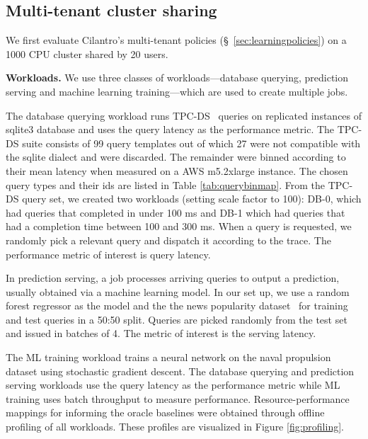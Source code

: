 
\subsection{Multi-tenant cluster sharing}
\label{sec:fixedclus}


We first evaluate Cilantro's multi-tenant policies (\S~\ref{sec:learningpolicies}) on a 1000 CPU
cluster shared by 20 users.


\textbf{Workloads.}
We use three classes of workloads---database querying, prediction serving and
machine learning training---which are used to create multiple jobs.

The database querying workload runs TPC-DS~\cite{tpc-ds} 
queries on replicated instances of sqlite3 database and uses the query latency as the performance metric. The TPC-DS suite consists of 99 query templates out of which 27 were not compatible with the sqlite dialect and were discarded. The remainder were binned according to their mean latency when measured on a AWS m5.2xlarge instance. The chosen query types and their ids are listed in Table \ref{tab:querybinmap}. From the TPC-DS query set, we created two workloads (setting scale factor to 100): DB-0, which had queries that completed in under 100 ms and DB-1 which had queries that had a completion time between 100 and 300 ms. When a query is requested, we randomly pick a relevant query and dispatch it
according to the trace. The performance metric of interest is  query latency. 

\insertTableQueryBins

In prediction serving, a job processes arriving queries
to output a prediction, usually obtained via a machine learning model.
In our set up, we use a random forest regressor as the model and the the news popularity
dataset~\cite{fernandes2015proactive} for training and test queries in a 50:50 split.
Queries are picked randomly from the test set and issued in batches of 4.
The metric of interest is the serving latency.

The ML training workload trains a neural network on the naval propulsion~\cite{coraddu2016machine} dataset using stochastic gradient descent. The database querying and prediction serving workloads use the query latency as the performance metric while ML training uses batch throughput to measure performance. Resource-performance mappings for informing the oracle baselines were obtained through offline profiling of all workloads. These profiles are visualized in Figure \ref{fig:profiling}.


